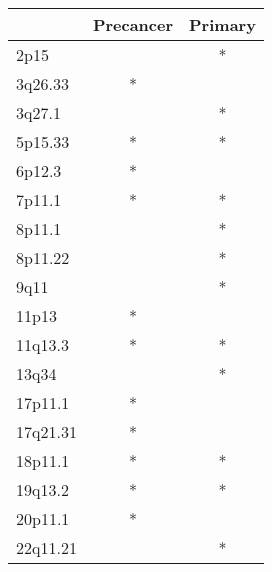 \begin{tabular}{lcc}
\toprule
{} & Precancer & Primary \\
\midrule
2p15     &           &       * \\
3q26.33  &         * &         \\
3q27.1   &           &       * \\
5p15.33  &         * &       * \\
6p12.3   &         * &         \\
7p11.1   &         * &       * \\
8p11.1   &           &       * \\
8p11.22  &           &       * \\
9q11     &           &       * \\
11p13    &         * &         \\
11q13.3  &         * &       * \\
13q34    &           &       * \\
17p11.1  &         * &         \\
17q21.31 &         * &         \\
18p11.1  &         * &       * \\
19q13.2  &         * &       * \\
20p11.1  &         * &         \\
22q11.21 &           &       * \\
\bottomrule
\end{tabular}
